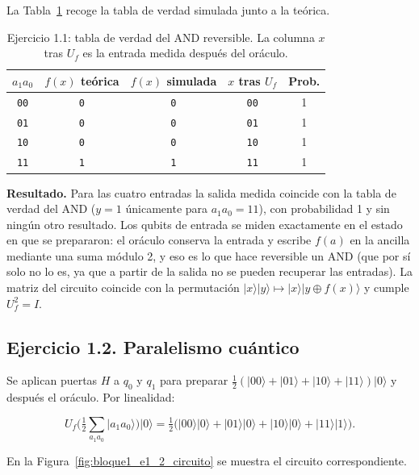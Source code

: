 La Tabla~\ref{tab:bloque1_e1_1} recoge la tabla de verdad simulada junto a la teórica.

\begin{table}[htbp]
    \centering
\begin{tabular}{c|c|c|c|c}
\hline
$a_1a_0$ & $f(x)$ teórica & $f(x)$ simulada & $x$ tras $U_f$ & Prob. \\
\hline
\texttt{00} & \texttt{0} & \texttt{0} & \texttt{00} & 1 \\
\texttt{01} & \texttt{0} & \texttt{0} & \texttt{01} & 1 \\
\texttt{10} & \texttt{0} & \texttt{0} & \texttt{10} & 1 \\
\texttt{11} & \texttt{1} & \texttt{1} & \texttt{11} & 1 \\
\hline
\end{tabular}
    \caption{Ejercicio 1.1: tabla de verdad del AND reversible. La columna $x$ tras $U_f$ es la entrada medida después del oráculo.}\label{tab:bloque1_e1_1}
\end{table}

\textbf{Resultado.} Para las cuatro entradas la salida medida coincide con la tabla de verdad del AND ($y=1$ únicamente para $a_1a_0=11$),
con probabilidad 1 y sin ningún otro resultado. Los qubits de entrada se miden exactamente en el estado en que se prepararon: el oráculo conserva la entrada
y escribe $f(a)$ en la ancilla mediante una suma módulo 2, y eso es lo que hace reversible un AND (que por sí solo no lo es, ya que a partir de la salida no se pueden
recuperar las entradas). La matriz del circuito coincide con la permutación $|x\rangle|y\rangle\mapsto|x\rangle|y\oplus f(x)\rangle$ y cumple $U_f^2=I$.

\subsection{Ejercicio 1.2. Paralelismo cuántico}

Se aplican puertas $H$ a $q_0$ y $q_1$ para preparar $\tfrac12(|00\rangle+|01\rangle+|10\rangle+|11\rangle)|0\rangle$ y después el oráculo. Por linealidad:

$$U_f\Big(\tfrac12\sum_{a_1a_0}|a_1a_0\rangle\Big)|0\rangle=\tfrac12\big(|00\rangle|0\rangle+|01\rangle|0\rangle+|10\rangle|0\rangle+|11\rangle|1\rangle\big).$$

En la Figura~\ref{fig:bloque1_e1_2_circuito} se muestra el circuito correspondiente.

